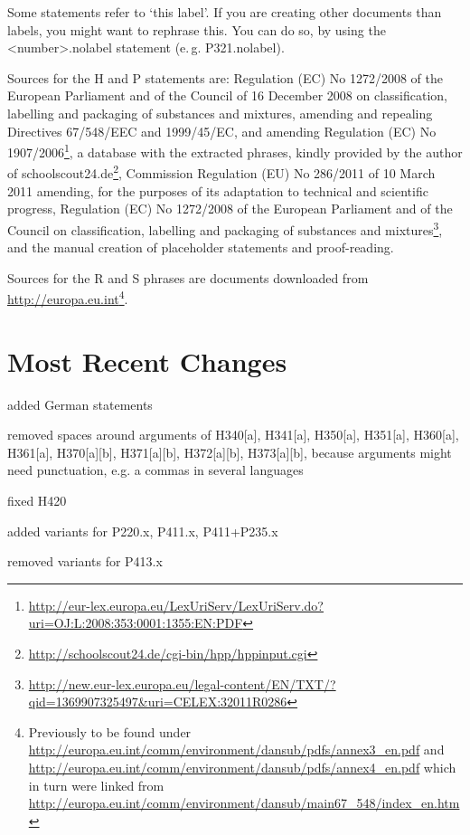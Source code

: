 \documentclass[a4paper,notitlepage]{scrreprt}
\newenvironment{annotation}{\bgroup\footnotesize}{\par\egroup}
\begin{document}
\noindent Some statements refer to `this label'. If you are creating other
documents than labels, you might want to rephrase this. You can do so, by using
the <number>.nolabel statement (e.\,g. P321.nolabel).
\bigskip

\begin{annotation}\RaggedRight Sources for the H and P statements are:
Regulation (EC) No 1272/2008 of the European Parliament and of the Council of 16
December 2008 on classification, labelling and packaging of substances and
mixtures, amending and repealing Directives 67/548/EEC and 1999/45/EC, and
amending Regulation (EC) No
1907/2006\footnote{\url{http://eur-lex.europa.eu/LexUriServ/LexUriServ.do?uri=OJ:L:2008:353:0001:1355:EN:PDF}},
a database with the extracted phrases, kindly provided by the author of
schoolscout24.de\footnote{\url{http://schoolscout24.de/cgi-bin/hpp/hppinput.cgi}},
Commission Regulation (EU) No 286/2011 of 10 March 2011 amending, for the
purposes of its adaptation to technical and scientific progress, Regulation (EC)
No 1272/2008 of the European Parliament and of the Council on classification,
labelling and packaging of substances and
mixtures\footnote{\url{http://new.eur-lex.europa.eu/legal-content/EN/TXT/?qid=1369907325497\&uri=CELEX:32011R0286}},
and the manual creation of placeholder statements and proof-reading.

Sources for the R and S phrases are documents downloaded from
\url{http://europa.eu.int}\footnote{Previously to be found under
\url{http://europa.eu.int/comm/environment/dansub/pdfs/annex3_en.pdf} and
\url{http://europa.eu.int/comm/environment/dansub/pdfs/annex4_en.pdf} which in
turn were linked from
\url{http://europa.eu.int/comm/environment/dansub/main67_548/index_en.htm}}.
\end{annotation}


\clearpage
\section{Most Recent Changes}%

\begin{compactitem}
\item added German statements
\item removed spaces around arguments of H340[a], H341[a], H350[a], H351[a], H360[a], H361[a], H370[a][b], H371[a][b], H372[a][b], H373[a][b], because arguments might need punctuation, e.g. a commas in several languages
\item fixed H420
\item added variants for P220.x, P411.x, P411+P235.x
\item removed variants for P413.x

\end{compactitem}
\end{document}
